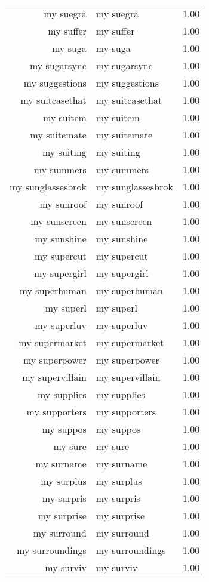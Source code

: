 \begin{table}[ht]
\begin{tabular}{rlr}
  my suegra & my suegra & 1.00 \\ 
  my suffer & my suffer & 1.00 \\ 
  my suga & my suga & 1.00 \\ 
  my sugarsync & my sugarsync & 1.00 \\ 
  my suggestions & my suggestions & 1.00 \\ 
  my suitcasethat & my suitcasethat & 1.00 \\ 
  my suitem & my suitem & 1.00 \\ 
  my suitemate & my suitemate & 1.00 \\ 
  my suiting & my suiting & 1.00 \\ 
  my summers & my summers & 1.00 \\ 
  my sunglassesbrok & my sunglassesbrok & 1.00 \\ 
  my sunroof & my sunroof & 1.00 \\ 
  my sunscreen & my sunscreen & 1.00 \\ 
  my sunshine & my sunshine & 1.00 \\ 
  my supercut & my supercut & 1.00 \\ 
  my supergirl & my supergirl & 1.00 \\ 
  my superhuman & my superhuman & 1.00 \\ 
  my superl & my superl & 1.00 \\ 
  my superluv & my superluv & 1.00 \\ 
  my supermarket & my supermarket & 1.00 \\ 
  my superpower & my superpower & 1.00 \\ 
  my supervillain & my supervillain & 1.00 \\ 
  my supplies & my supplies & 1.00 \\ 
  my supporters & my supporters & 1.00 \\ 
  my suppos & my suppos & 1.00 \\ 
  my sure & my sure & 1.00 \\ 
  my surname & my surname & 1.00 \\ 
  my surplus & my surplus & 1.00 \\ 
  my surpris & my surpris & 1.00 \\ 
  my surprise & my surprise & 1.00 \\ 
  my surround & my surround & 1.00 \\ 
  my surroundings & my surroundings & 1.00 \\ 
  my surviv & my surviv & 1.00 \\ 

\end{tabular}
\end{table}
